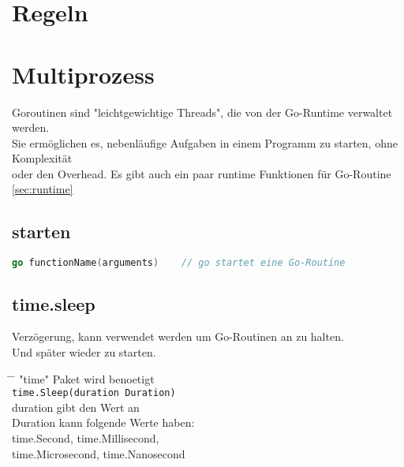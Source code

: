 \documentclass[twoside,a4paper,12pt]{article}
\begin{document}
\section{Regeln}

\section{Multiprozess}
Goroutinen sind "leichtgewichtige Threads", die von der Go-Runtime verwaltet werden. \\ 
Sie ermöglichen es, nebenläufige Aufgaben in einem Programm zu starten, ohne Komplexität \\ 
oder den Overhead. Es gibt auch ein paar runtime Funktionen für Go-Routine \ref{sec:runtime} \\ 

\subsection{starten}
\begin{center}
  \begin{minipage}{1.0\textwidth}
    \begin{lstlisting}[language=Go]
    go functionName(arguments)    // go startet eine Go-Routine 
    \end{lstlisting}
  \end{minipage}
\end{center}

\subsection{time.sleep}
Verzögerung, kann verwendet werden um Go-Routinen an zu halten. \\ 
Und später wieder zu starten.
\begin{tabbing}
 \hspace{2mm} \= \hspace{50mm} \= \kill
 \> "time" \> Paket wird benoetigt \\
 \> \verb|time.Sleep(duration Duration)| \\ 
 \> \> duration gibt den Wert an \\ 
 \> \> Duration kann folgende Werte haben: \\ 
 \> \> time.Second, time.Millisecond, \\ 
 \> \> time.Microsecond, time.Nanosecond \\ 
\end{tabbing}
\end{document}
